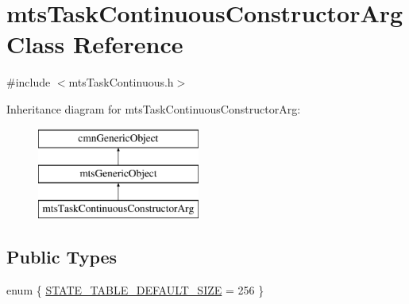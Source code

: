 \hypertarget{classmts_task_continuous_constructor_arg}{\section{mts\-Task\-Continuous\-Constructor\-Arg Class Reference}
\label{classmts_task_continuous_constructor_arg}
}


{\ttfamily \#include $<$mts\-Task\-Continuous.\-h$>$}

Inheritance diagram for mts\-Task\-Continuous\-Constructor\-Arg\-:\begin{figure}[H]
\begin{center}
\leavevmode
\includegraphics[height=3.000000cm]{d2/d85/classmts_task_continuous_constructor_arg}
\end{center}
\end{figure}
\subsection*{Public Types}
\begin{DoxyCompactItemize}
\item 
enum \{ \hyperlink{classmts_task_continuous_constructor_arg_ad66f44f9a55553807a393bcc75f4e672aa445b554da5472573538670101b0cc34}{S\-T\-A\-T\-E\-\_\-\-T\-A\-B\-L\-E\-\_\-\-D\-E\-F\-A\-U\-L\-T\-\_\-\-S\-I\-Z\-E} = 256
 \}
\end{DoxyCompactItemize}
